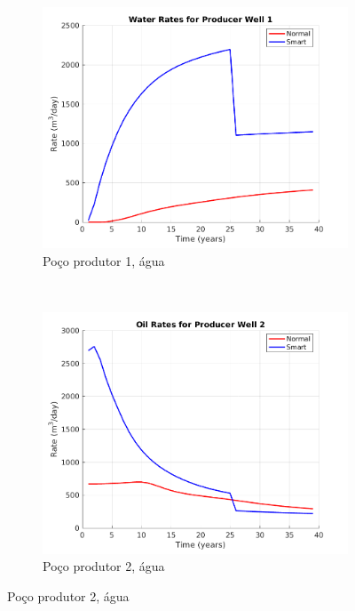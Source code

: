 \begin{figure}[!ht]
	\centering
	\begin{subfigure}[b]{.45\textwidth}
		\includegraphics[width=\textwidth]{figs/resultadosLSAIGUP/LSAIGUP_WaterWell1_Zoom}
		\caption{Po\c{c}o produtor 1, \'{a}gua}
		\label{LSAIGUP_WaterWell1}
	\end{subfigure}
	~
	\begin{subfigure}[b]{.45\textwidth}
		\includegraphics[width=\textwidth]{figs/resultadosLSAIGUP/LSAIGUP_OilWell2_Zoom}
		\caption{Po\c{c}o produtor 2, \'{a}gua}
		\label{LSAIGUP_WaterWell2}
	\end{subfigure}
	

\end{figure}
